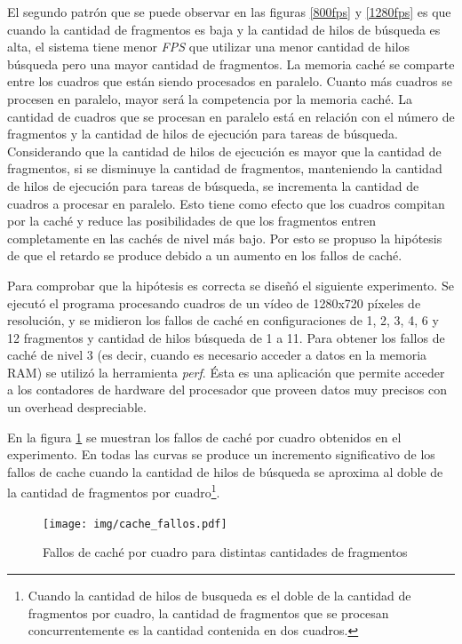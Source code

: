 El segundo patrón que se puede observar en las figuras \ref{800fps} y
\ref{1280fps} es que cuando la cantidad de fragmentos es baja y la cantidad de
hilos de búsqueda es alta, el sistema tiene menor \emph{FPS} que utilizar una
menor cantidad de hilos búsqueda pero una mayor cantidad de fragmentos. La
memoria caché se comparte entre los cuadros que están siendo procesados en
paralelo. Cuanto más cuadros se procesen en paralelo, mayor será la competencia
por la memoria caché. La cantidad de cuadros que se procesan en paralelo está en
relación con el número de fragmentos y la cantidad de hilos de ejecución para
tareas de búsqueda. Considerando que la cantidad de hilos de ejecución es mayor
que la cantidad de fragmentos, si se disminuye la cantidad de fragmentos,
manteniendo la cantidad de hilos de ejecución para tareas de búsqueda, se
incrementa la cantidad de cuadros a procesar en paralelo. Esto tiene como efecto
que los cuadros compitan por la caché y reduce las posibilidades de que los
fragmentos entren completamente en las cachés de nivel más bajo. Por esto se
propuso la hipótesis de que el retardo se produce debido a un aumento en los
fallos de caché.

Para comprobar que la hipótesis es correcta se diseñó el siguiente experimento.
Se ejecutó el programa procesando cuadros de un vídeo de 1280x720 píxeles de
resolución, y se midieron los fallos de caché en configuraciones de 1, 2, 3, 4,
6 y 12 fragmentos y cantidad de hilos búsqueda de 1 a 11. Para obtener los
fallos de caché de nivel 3 (es decir, cuando es necesario acceder a datos en la
memoria RAM) se utilizó la herramienta \emph{perf}. Ésta es una aplicación que
permite acceder a los contadores de hardware del procesador que proveen datos
muy precisos con un overhead despreciable.

En la figura \ref{cacheFallos} se muestran los fallos de caché por cuadro
obtenidos en el experimento. En todas las curvas se produce un incremento
significativo de los fallos de cache cuando la cantidad de hilos de búsqueda se
aproxima al doble de la cantidad de fragmentos por cuadro\footnote{Cuando la
cantidad de hilos de busqueda es el doble de la cantidad de fragmentos por
cuadro, la cantidad de fragmentos que se procesan concurrentemente es la
cantidad contenida en dos cuadros.}.

\begin{figure}[!h]

	\texttt{[image: img/cache\_fallos.pdf]}
	\caption{Fallos de caché por cuadro para distintas cantidades de
	fragmentos}
	\label{cacheFallos}

\end{figure}


